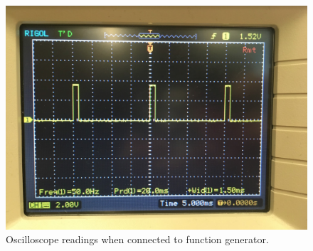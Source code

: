 \documentclass{article}
\begin{document}
	\begin{figure}[h!]
		\includegraphics[width=\linewidth]{oscilloscope.png}
		\caption{Oscilloscope readings when connected to function generator.}
		\label{fig:oscilloscope}
	\end{figure}
\end{document}
